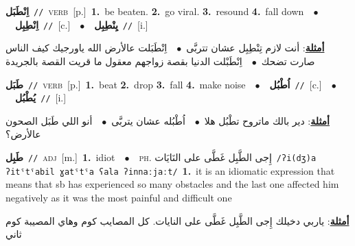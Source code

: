 \documentclass[10pt,a4paper,twoside]{article} %
\begin{document}
\begin{multicols}{2}
{\setlength\topsep{0pt}\textbf{\foreignlanguage{arabic}{اِنْطَبَل}}\ {\color{gray}\texttt{//}\color{black}}\ \textsc{verb}\ [p.]\ \textbf{1.}~be beaten.  \textbf{2.}~go viral.  \textbf{3.}~resound  \textbf{4.}~fall down\ \ $\bullet$\ \ \setlength\topsep{0pt}\textbf{\foreignlanguage{arabic}{اِنْطِبِل}}\ {\color{gray}\texttt{//}\color{black}}\ [c.]\ \ $\bullet$\ \ \setlength\topsep{0pt}\textbf{\foreignlanguage{arabic}{يِنْطِبِل}}\ {\color{gray}\texttt{//}\color{black}}\ [i.]\  \begin{flushright}\color{gray}\foreignlanguage{arabic}{\textbf{\underline{\foreignlanguage{arabic}{أمثلة}}}: أنت لازم تِنْطِبِل عشان تتربَّى\ $\bullet$\ \  اِنْطَبَلت عالأرض الله ياورجيك كيف الناس صارت تضحك\ $\bullet$\ \  اِنْطَبْلت الدنيا بقصة زواجهم معقول ما قريت القصة بالجريدة}\end{flushright}\color{black}} \vspace{2mm}

{\setlength\topsep{0pt}\textbf{\foreignlanguage{arabic}{طَبَل}}\ {\color{gray}\texttt{//}\color{black}}\ \textsc{verb}\ [p.]\ \textbf{1.}~beat  \textbf{2.}~drop  \textbf{3.}~fall  \textbf{4.}~make noise\ \ $\bullet$\ \ \setlength\topsep{0pt}\textbf{\foreignlanguage{arabic}{اُطْبُل}}\ {\color{gray}\texttt{//}\color{black}}\ [c.]\ \ $\bullet$\ \ \setlength\topsep{0pt}\textbf{\foreignlanguage{arabic}{يُطْبُل}}\ {\color{gray}\texttt{//}\color{black}}\ [i.]\  \begin{flushright}\color{gray}\foreignlanguage{arabic}{\textbf{\underline{\foreignlanguage{arabic}{أمثلة}}}: دير بالك ماتروح تطْبُل هلا\ $\bullet$\ \  اُطْبُله عشان يتربَّى\ $\bullet$\ \  أنو اللي طَبَل الصحون عالأرض؟}\end{flushright}\color{black}} \vspace{2mm}

{\setlength\topsep{0pt}\textbf{\foreignlanguage{arabic}{طَبِل}}\ {\color{gray}\texttt{//}\color{black}}\ \textsc{adj}\ [m.]\ \textbf{1.}~idiot\ \ $\bullet$\ \ \textsc{ph.} \color{gray} \foreignlanguage{arabic}{إِجى الطَّبِل غَطَّى على النَايَات}\color{black}\ {\color{gray}\texttt{/{\sffamily ʔi(dʒ)a ʔitˤtˤabil ɣatˤtˤa ʕala ʔinnaːjaːt}/}\color{black}}\ \textbf{1.}~it is an idiomatic expression that means that sb has experienced so many obstacles and the last one affected him negatively as it was the most painful and difficult one\  \begin{flushright}\color{gray}\foreignlanguage{arabic}{\textbf{\underline{\foreignlanguage{arabic}{أمثلة}}}: ياربي دخيلك إِجى الطَّبِل غَطَّى على النايات. كل المصايب كوم وهاي المصيبة كوم ثاني}\end{flushright}\color{black}} \vspace{2mm}


\end{multicols}
\end{document}
